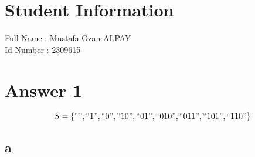 \documentclass[11pt]{article}
\begin{document}
\section*{Student Information } 
Full Name : Mustafa Ozan ALPAY \\
Id Number : 2309615 \\

\section*{Answer 1}
$$ S= \{``",``1",``0",``10",``01",``010",``011",``101",``110" \}$$ 
\subsection*{a}  
\end{document}
